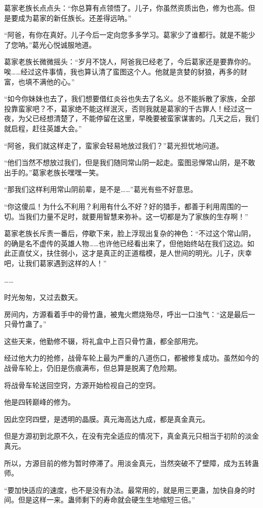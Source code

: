 \begin{this_body}
葛家老族长点点头：“你总算有点领悟了。儿子，你虽然资质出色，修为也高。但是要成为葛家的新任族长。还差得远呐。”

“阿爸，有你在真好。儿子今后一定向您多多学习。葛家少了谁都行。就是不能少了您呐。”葛光心悦诚服地道。

葛家老族长微微摇头：“岁月不饶人，阿爸我已经老了，今后葛家还是要靠你的。唉……经过这件事情，我也算认清了蛮图这个人。他就是贪婪的豺狼，再多的财富，也填不满他的心。”

“如今你妹妹也去了，我们想要借红炎谷也失去了名义。总不能拆散了家族，全部投靠蛮家吧？不，葛家绝不能这样泯灭，否则我就是葛家的千古罪人！经过这一夜，为父已经想清楚了，不能停留在这里，早晚要被蛮家谋害的。几天之后，我们就启程，赶往英雄大会。”

“阿爸，我们就这样走了，蛮家会轻易地放过我们？”葛光担忧地问道。

“他们当然不想放过我们，但是我们随同常山阴一起走。蛮图忌惮常山阴，是不敢出手的。”葛家老族长嘿嘿一笑。

“那我们这样利用常山阴前辈，是不是……”葛光有些不好意思。

“你这傻瓜！为什么不利用？利用有什么不好？好的猎手，都善于利用周围的一切。当我们力量不足时，就要用智慧来弥补。这一切都是为了家族的生存啊！”

葛家老族长斥责一番后，停歇下来，脸上浮现出复杂的神色：“不过这个常山阴，的确是名不虚传的英雄人物……也许他已经看出来了，但他始终站在我们这边。如此正直仗义，扶住弱小，这才是真正的正道楷模，是人世间的明光。儿子，庆幸吧，让我们葛家遇到这样的人！”

……

时光匆匆，又过去数天。

房间内，方源看着手中的骨竹蛊，被鬼火燃烧殆尽，呼出一口浊气：“这是最后一只骨竹蛊了。”

这些天来，他勤修不辍，将礼盒中上百只骨竹蛊，都全部用完。

经过他大力的抢修，战骨车轮上最为严重的八道伤口，都被修复成功。虽然如今的战骨车轮上，仍旧是伤痕满布，但总算是脱离了危险期。

将战骨车轮送回空窍，方源开始检视自己的空窍。

他是四转巅峰的修为。

因此空窍四壁，是透明的晶膜。真元海高达九成，都是真金真元。

但是方源初到北原不久，在没有完全适应的情况下，真金真元只相当于初阶的淡金真元。

所以，方源目前的修为暂时停滞了。用淡金真元，当然突破不了壁障，成为五转蛊师。

“要加快适应的速度，也不是没有办法。最常用的，就是用三更蛊，加快自身的时间。但是这样一来。蛊师剩下的寿命就会硬生生地缩短三倍。”


\end{this_body}
